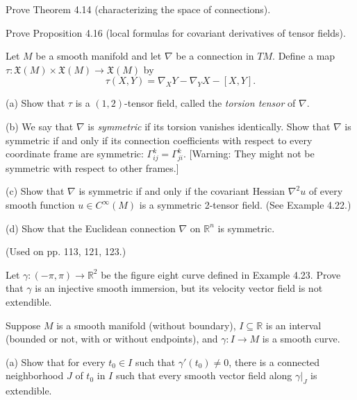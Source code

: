 \begin{exercise}\label{prob:characterizing-connections}
Prove Theorem 4.14 (characterizing the space of connections).
\end{exercise}

\begin{exercise}\label{prob:tensor-field-formulas}
Prove Proposition 4.16 (local formulas for covariant derivatives of tensor fields).
\end{exercise}

\begin{exercise}\label{prob:torsion-tensor}
Let $M$ be a smooth manifold and let $\nabla$ be a connection in $TM$. Define a map $\tau: \mathfrak{X}(M) \times \mathfrak{X}(M) \to \mathfrak{X}(M)$ by
\[
\tau(X,Y) = \nabla_X Y - \nabla_Y X - [X,Y].
\]

(a) Show that $\tau$ is a $(1,2)$-tensor field, called the \textit{torsion tensor} of $\nabla$.

(b) We say that $\nabla$ is \textit{symmetric} if its torsion vanishes identically. Show that $\nabla$ is symmetric if and only if its connection coefficients with respect to every coordinate frame are symmetric: $\Gamma^k_{ij} = \Gamma^k_{ji}$. [Warning: They might not be symmetric with respect to other frames.]

(c) Show that $\nabla$ is symmetric if and only if the covariant Hessian $\nabla^2 u$ of every smooth function $u \in C^\infty(M)$ is a symmetric 2-tensor field. (See Example 4.22.)

(d) Show that the Euclidean connection $\nabla$ on $\mathbb{R}^n$ is symmetric.

(Used on pp. 113, 121, 123.)
\end{exercise}

\begin{exercise}\label{prob:figure-eight-immersion}
Let $\gamma: (-\pi, \pi) \to \mathbb{R}^2$ be the figure eight curve defined in Example 4.23. Prove that $\gamma$ is an injective smooth immersion, but its velocity vector field is not extendible.
\end{exercise}

\begin{exercise}\label{prob:vector-field-extendibility}
Suppose $M$ is a smooth manifold (without boundary), $I \subseteq \mathbb{R}$ is an interval (bounded or not, with or without endpoints), and $\gamma: I \to M$ is a smooth curve.

(a) Show that for every $t_0 \in I$ such that $\gamma'(t_0) \neq 0$, there is a connected neighborhood $J$ of $t_0$ in $I$ such that every smooth vector field along $\gamma|_J$ is extendible.
\end{exercise}

